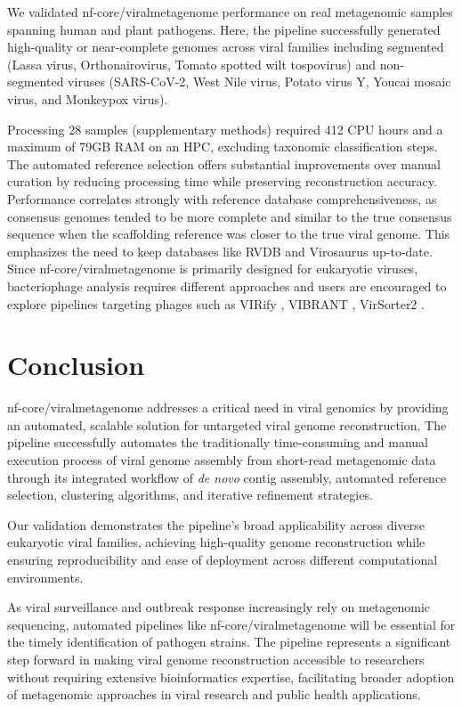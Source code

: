 We validated nf-core/viralmetagenome performance on real metagenomic samples spanning human and plant pathogens. Here, the pipeline successfully generated high-quality or near-complete genomes across viral families including segmented (Lassa virus, Orthonairovirus, Tomato spotted wilt tospovirus) and non-segmented viruses (SARS-CoV-2, West Nile virus, Potato virus Y, Youcai mosaic virus, and Monkeypox virus).

Processing 28 samples (supplementary methods) required 412 CPU hours and a maximum of 79GB RAM on an HPC, excluding taxonomic classification steps. The automated reference selection offers substantial improvements over manual curation by reducing processing time while preserving reconstruction accuracy. Performance correlates strongly with reference database comprehensiveness, as consensus genomes tended to be more complete and similar to the true consensus sequence when the scaffolding reference was closer to the true viral genome. This emphasizes the need to keep databases like RVDB \citep{Goodacre2018-dw} and Virosaurus \citep{Gleizes2020-rq} up-to-date. Since nf-core/viralmetagenome is primarily designed for eukaryotic viruses, bacteriophage analysis requires different approaches and users are encouraged to explore pipelines targeting phages such as VIRify \citep{Rangel-Pineros2022-wv}, VIBRANT \citep{Kieft2020-aq}, VirSorter2 \citep{Guo2021-rf}.


\section{Conclusion}

nf-core/viralmetagenome addresses a critical need in viral genomics by providing an automated, scalable solution for untargeted viral genome reconstruction. The pipeline successfully automates the traditionally time-consuming and manual execution process of viral genome assembly from short-read metagenomic data through its integrated workflow of \textit{de novo} contig assembly, automated reference selection, clustering algorithms, and iterative refinement strategies.

Our validation demonstrates the pipeline's broad applicability across diverse eukaryotic viral families, achieving high-quality genome reconstruction while ensuring reproducibility and ease of deployment across different computational environments.

As viral surveillance and outbreak response increasingly rely on metagenomic sequencing, automated pipelines like nf-core/viralmetagenome will be essential for the timely identification of pathogen strains. The pipeline represents a significant step forward in making viral genome reconstruction accessible to researchers without requiring extensive bioinformatics expertise, facilitating broader adoption of metagenomic approaches in viral research and public health applications.


